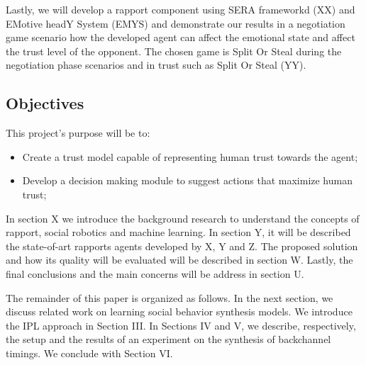 Lastly, we will  develop a rapport component using SERA frameworkd (XX) and EMotive headY System (EMYS) and demonstrate our results in a negotiation game scenario how the developed agent can affect the emotional state and affect the trust level of the opponent. The chosen game is Split Or Steal during the negotiation phase scenarios and in trust such as Split Or Steal (YY).


%
%



\subsection{Objectives}
\label{subsec:Objectives}
This project's purpose will be to:
\begin{itemize}
	\item Create a trust model capable of representing human trust towards the agent;
	\item Develop a decision making module to suggest actions that maximize human trust;
\end{itemize}





In section X we introduce the background research to understand the concepts of rapport, social robotics and machine learning. In section Y, it will be described the state-of-art rapports agents developed by X, Y and Z. The proposed solution and how its quality will be evaluated will be described in section W. Lastly, the final conclusions and the main concerns will be address in section U.

The remainder of this paper is organized as follows. In
the next section, we discuss related work on learning social behavior synthesis models. We introduce the IPL approach in Section III. In Sections IV and V, we describe, respectively, the setup and the results of an experiment on the synthesis of backchannel timings. We conclude with Section VI.
